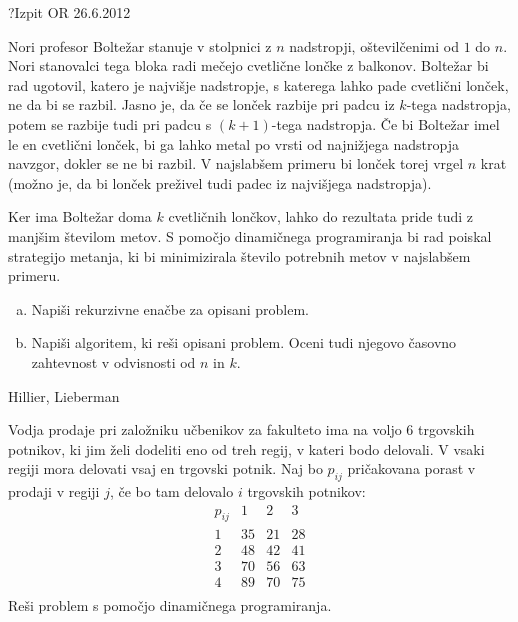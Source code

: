 \begin{naloga}{?}{Izpit OR 26.6.2012}
\begin{vprasanje}
Nori profesor Boltežar stanuje v stolpnici z $n$ nadstropji,
oštevilčenimi od $1$ do $n$.
Nori stanovalci tega bloka radi mečejo cvetlične lončke z balkonov.
Boltežar bi rad ugotovil, katero je najvišje nadstropje,
s katerega lahko pade cvetlični lonček, ne da bi se razbil.
Jasno je, da če se lonček razbije pri padcu iz $k$-tega nadstropja,
potem se razbije tudi pri padcu s $(k+1)$-tega nadstropja.
Če bi Boltežar imel le en cvetlični lonček,
bi ga lahko metal po vrsti od najnižjega nadstropja navzgor,
dokler se ne bi razbil.
V najslabšem primeru bi lonček torej vrgel $n$ krat
(možno je, da bi lonček preživel tudi padec iz najvišjega nadstropja).

Ker ima Boltežar doma $k$ cvetličnih lončkov,
lahko do rezultata pride tudi z manjšim številom metov.
S pomočjo dinamičnega programiranja bi rad poiskal strategijo metanja,
ki bi minimizirala število potrebnih metov v najslabšem primeru.
\begin{enumerate}[(a)]
\item Napiši rekurzivne enačbe za opisani problem.
\item Napiši algoritem, ki reši opisani problem.
Oceni tudi njegovo časovno zahtevnost v odvisnosti od $n$ in $k$.
\end{enumerate}

\end{vprasanje}
\begin{odgovor}
\end{odgovor}
\end{naloga}


\begin{naloga}{Hillier, Lieberman}{\cite[Problem~11.2-2]{hl}}
\begin{vprasanje}
Vodja prodaje pri založniku učbenikov za fakulteto
ima na voljo $6$ trgovskih potnikov,
ki jim želi dodeliti eno od treh regij, v kateri bodo delovali.
V vsaki regiji mora delovati vsaj en trgovski potnik.
Naj bo $p_{ij}$ pričakovana porast v prodaji v regiji $j$,
če bo tam delovalo $i$ trgovskih potnikov:
$$
\begin{array}{c|ccc}
p_{ij} & 1 & 2 & 3 \\
\hline
1 & 35 & 21 & 28 \\
2 & 48 & 42 & 41 \\
3 & 70 & 56 & 63 \\
4 & 89 & 70 & 75 \\
\end{array}
$$
Reši problem s pomočjo dinamičnega programiranja.

\end{vprasanje}
\begin{odgovor}
\end{odgovor}
\end{naloga}


